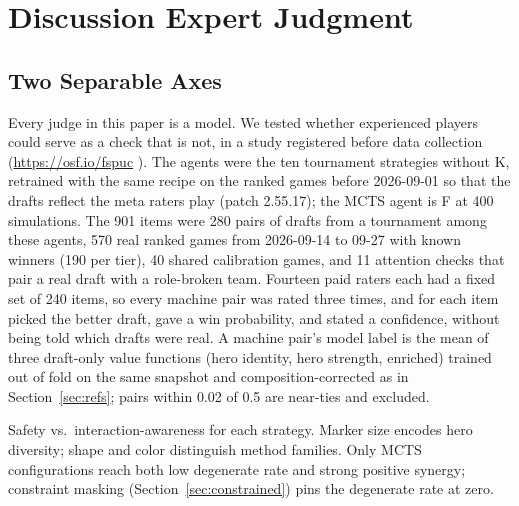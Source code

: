\documentclass[journal]{IEEEtran}
\providecommand{\DIFaddtex}[1]{{\protect\color{blue} \sf #1}} %
\providecommand{\DIFdeltex}[1]{{\protect\color{red} \scriptsize #1}} %
\providecommand{\DIFaddbegin}{} %
\providecommand{\DIFaddend}{} %
\providecommand{\DIFdelbegin}{} %
\providecommand{\DIFdelend}{} %
\providecommand{\DIFdelFL}[1]{\DIFdel{#1}} %
\providecommand{\DIFadd}[1]{\texorpdfstring{\DIFaddtex{#1}}{#1}} %
\providecommand{\DIFdel}[1]{\texorpdfstring{\DIFdeltex{#1}}{}} %
\begin{document}
\section{\DIFdelbegin \DIFdel{Discussion}\DIFdelend \DIFaddbegin \DIFadd{Expert Judgment}\DIFaddend }
\DIFdelbegin %
\DIFdelend \DIFaddbegin \label{sec:expert}
\DIFaddend 

\DIFdelbegin \subsection{\DIFdel{Two Separable Axes}}
\addtocounter{subsection}{-1}%
\DIFdelend \DIFaddbegin \DIFadd{Every judge in this paper is a model. We tested whether experienced players could serve as a check that is not, in a study registered before data collection (}\url{https://osf.io/fspuc}\DIFadd{). The agents were the ten tournament strategies without K, retrained with the same recipe on the ranked games before 2026-09-01 so that the drafts reflect the meta raters play (patch 2.55.17); the MCTS agent is F at 400 simulations. The 901 items were 280 pairs of drafts from a tournament among these agents, 570 real ranked games from 2026-09-14 to 09-27 with known winners (190 per tier), 40 shared calibration games, and 11 attention checks that pair a real draft with a role-broken team. Fourteen paid raters each had a fixed set of 240 items, so every machine pair was rated three times, and for each item picked the better draft, gave a win probability, and stated a confidence, without being told which drafts were real. A machine pair's model label is the mean of three draft-only value functions (hero identity, hero strength, enriched) trained out of fold on the same snapshot and composition-corrected as in Section~\ref{sec:refs}; pairs within 0.02 of 0.5 are near-ties and excluded.
}\DIFaddend 

\DIFdelbegin %
{%
\DIFdelFL{Safety vs.\ interaction-awareness for each strategy. Marker size encodes hero diversity; shape and color distinguish method families. Only MCTS configurations reach both low degenerate rate and strong positive synergy; constraint masking (Section~\ref{sec:constrained}) pins the degenerate rate at zero.}}
\end{document}
